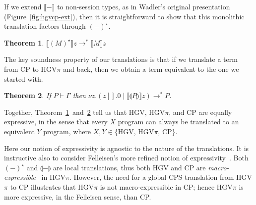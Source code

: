 \documentclass{easychair}
\makeatletter
\newtheorem{theorem}{Theorem}
\newcommand{\ba}{\begin{array}}
\newcommand{\ea}{\end{array}}
\newenvironment{equations}{\[\ba{@{}r@{~}c@{~}l@{}}}{\ea\]}
\newcommand{\cptogv}[1]{\llparenthesis{#1}\rrparenthesis}
\newcommand{\cpj}[2]{{#1} \vdash {#2}}
\newcommand{\gvj}[3]{{#1} \vdash {#2} : {#3}}
\newcommand{\G}{\Gamma}
\newcommand{\cpCut}[3]{\nu {#1}.({#2} \mid {#3})}
\newcommand{\cpEmptyOut}[1]{{#1}[].0}
\newcommand{\cpDual}[1]{{#1}^\bot}
\newcommand{\hgv}{HGV\xspace}
\newcommand{\hgvpi}{HGV$\pi$\xspace}
\newcommand{\lampi}[1]{({#1})^\star}
\newcommand{\hgvcp}[1]{\llbracket{#1}\rrbracket}
\newcommand{\redto}{\longrightarrow}
\makeatother
\begin{document}
If we extend $\hgvcp{-}$ to non-session types, as in Wadler's original presentation
(Figure~\ref{fig:hgvcp-ext}), then it is straightforward to show that this monolithic translation
factors through $\lampi{-}$.
\begin{theorem}
\label{th:factor}
$\hgvcp{\lampi{M}}z \redto^* \hgvcp{M}z$
\end{theorem}
\noindent
The key soundness property of our translations is that if we translate a term from CP to \hgvpi and
back, then we obtain a term equivalent to the one we started with.
\begin{theorem}
\label{th:soundness}
If $\cpj{P}{\G}$ then $\cpCut{z}{\cpEmptyOut{z}}{\hgvcp{\cptogv{P}}z} \redto^* P$.
\end{theorem}
\noindent
Together, Theorem~\ref{th:factor}~and~\ref{th:soundness} tell us that \hgv, \hgvpi, and CP are
equally expressive, in the sense that every $X$ program can always be translated to an equivalent
$Y$ program, where $X,Y \in \{$\hgv, \hgvpi, CP$\}$.

Here our notion of expressivity is agnostic to the nature of the translations. It is instructive
also to consider Felleisen's more refined notion of expressivity~\cite{Felleisen91}. Both
$\lampi{-}$ and $\cptogv{-}$ are local translations, thus both \hgv and CP are
\emph{macro-expressible}~\cite{Felleisen91} in \hgvpi. However, the need for a global CPS
translation from \hgvpi to CP illustrates that \hgvpi is not macro-expressible in CP; hence \hgvpi
is more expressive, in the Felleisen sense, than CP.
%





\end{document}
